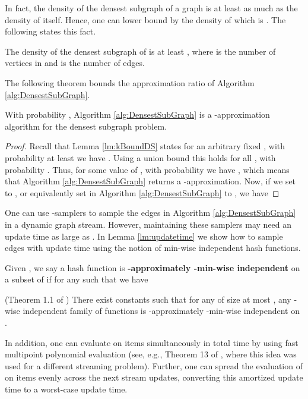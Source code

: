 In fact, the density of the densest subgraph of a graph  is at least as much as the density of  itself. Hence, one can lower bound  by the density of  which is . The following states this fact.

\begin{fact} \label{fc:boundOpt}
The density of the densest subgraph of  is at least , where  is the number of vertices in  and  is the number of edges.
\end{fact}

The following theorem bounds the approximation ratio of Algorithm \ref{alg:DensestSubGraph}. 

\begin{theorem}\label{thm:mainDS}
With probability , Algorithm \ref{alg:DensestSubGraph} is a -approximation algorithm for the densest subgraph problem.
\end{theorem}

\begin{proof}
	Recall that Lemma \ref{lm:kBoundDS} states for an arbitrary fixed , with probability at least  we have 
	. Using a union bound this holds for all , with probability . Thus, for some value of , with probability  we have , which means that Algorithm \ref{alg:DensestSubGraph} returns a -approximation. Now, if we set  to , or equivalently set  in Algorithm \ref{alg:DensestSubGraph} to , we have
	
\end{proof}



One can use -samplers \cite{jst11} 
to sample the  edges in Algorithm \ref{alg:DensestSubGraph} in a dynamic graph stream. However, maintaining these  samplers may need an update time as large as .
In Lemma \ref{lm:updatetime} we show how to sample  edges with  update time using the notion of min-wise independent hash functions.
\begin{definition}
Given , 
we say a hash function  is {\bf -approximately -min-wise independent} on a subset  of  
if for any  such that  we have

\end{definition}

\begin{theorem}\label{lm:min-wise}(Theorem 1.1 of \cite{feigenblat2011exponential})
There exist constants  such that for any  of size at most
, any -wise independent
family of functions  is -approximately -min-wise independent on . 

In addition, one can evaluate  on  items simultaneously
in total time  by using fast multipoint polynomial
evaluation (see, e.g., Theorem 13 of \cite{knpw11}, where this idea was used for a different
streaming problem). Further, one can spread the evaluation
of  on  items evenly across the next  stream updates, converting this amortized
 update time to a worst-case update time. 
\end{theorem}


